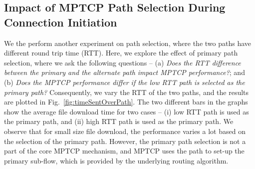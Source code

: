 \subsection{Impact of MPTCP Path Selection During Connection Initiation}
We the perform another experiment on path selection, where the two paths have different round trip time (RTT). Here, we explore the effect of primary path selection, where we ask the following questions -- (a) {\em Does the RTT difference between the primary and the alternate path impact MPTCP performance?}; and (b) {\em Does the MPTCP performance differ if the low RTT path is selected as the primary path?} Consequently, we vary the RTT of the two paths, and the results are plotted in Fig.~\ref{fig:timeSentOverPath}. The two different bars in the graphs show the average file download time for two cases --  (i) low RTT path is used as the primary path, and (ii) high RTT path is used as the primary path. We observe that for small size file download, the performance varies a lot based on the selection of the primary path. However, the primary path selection is not a part of the core MPTCP mechanism, and MPTCP uses the path to set-up the primary sub-flow, which is provided by the underlying routing algorithm.  


%		

